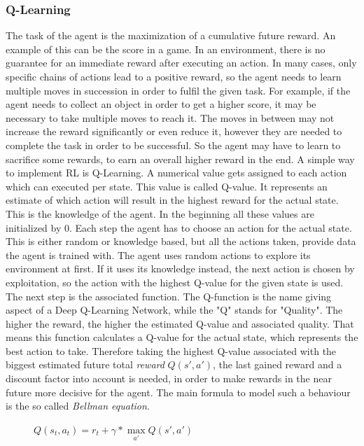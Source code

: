 	\subsubsection{Q-Learning}
		The task of the agent is the maximization of a cumulative future reward.
		An example of this can be the score in a game.
		In an environment, there is no guarantee for an immediate reward after executing an action.
		In many cases, only specific chains of actions lead to a positive reward, so the agent needs to learn multiple moves in succession in order to fulfil the given task.
		For example, if the agent needs to collect an object in order to get a higher score, it may be necessary to take multiple moves to reach it.
		The moves in between may not increase the reward significantly or even reduce it, however they are needed to complete the task in order to be successful.
		So the agent may have to learn to sacrifice some rewards, to earn an overall higher reward in the end.
		A simple way to implement RL is Q-Learning. A numerical value gets assigned to each action which can executed per state.
		This value is called Q-value.
		It represents an estimate of which action will result in the highest reward for the actual state.
		This is the knowledge of the agent.
		In the beginning all these values are initialized by 0.
		Each step the agent has to choose an action for the actual state.
		This is either random or knowledge based, but all the actions taken, provide data the agent is trained with.
		The agent uses random actions to explore its environment at first.
		If it uses its knowledge instead, the next action is chosen by exploitation, so the action with the highest Q-value for the given state is used.
		The next step is the associated function.
		The Q-function is the name giving aspect of a Deep Q-Learning Network, while the "Q" stands for "Quality".
		The higher the reward, the higher the estimated Q-value and associated quality.
		That means this function calculates a Q-value for the actual state, which represents the best action to take.
		Therefore taking the highest Q-value associated with the biggest estimated future total \textit{reward} $Q(s', a')$, the last gained reward and a discount factor into account is needed, in order to make rewards in the near future more decisive for the agent.
		The main formula to model such a behaviour is the so called \textit{Bellman equation}.
		
		\begin{figure}[h!]
			\begin{center}
				$Q(s_t, a_t) = r_t + \gamma * \max\limits_{a'} Q(s', a')$
			\end{center}
		\end{figure}